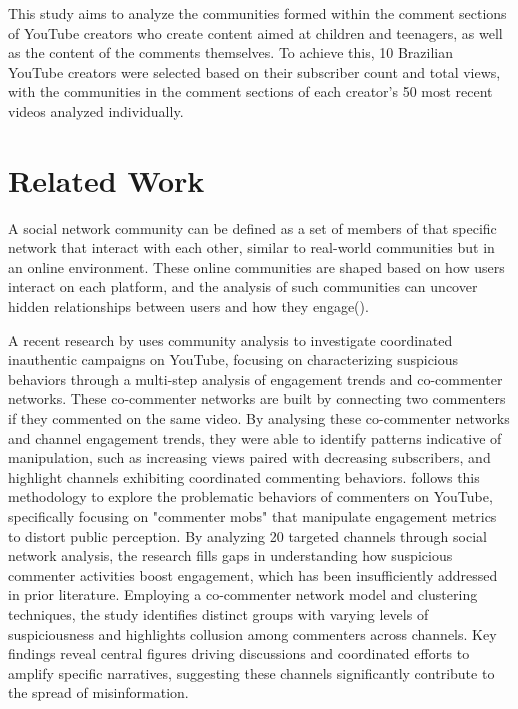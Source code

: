 \documentclass[12pt]{article}
\begin{document}
This study aims to analyze the communities formed within the comment sections of 
YouTube creators who create content aimed at children and teenagers, as well as the content of the 
comments themselves. 
To achieve this, 10 Brazilian YouTube creators were selected based on their 
subscriber count and total views, with the communities in the comment sections of each creator's 50
most recent videos analyzed individually.

\section{Related Work}

A social network community can be defined as a set of members of that specific network that interact
with each other, similar to real-world communities but in an online environment.
These online communities are shaped based on how users interact on each platform, and the analysis
of such communities can uncover hidden relationships between users and how they engage(\cite{nooribakhsh2024community}).

A recent research by \cite{kirdemir2023} uses community analysis to investigate coordinated 
inauthentic campaigns on YouTube, focusing on characterizing suspicious behaviors through a 
multi-step analysis of engagement trends and co-commenter networks. These co-commenter networks are
built by connecting two commenters if they commented on the same video.
By analysing these co-commenter networks and channel engagement trends, they were able to identify
patterns indicative of manipulation, such as increasing views paired with decreasing subscribers, 
and highlight channels exhibiting coordinated 
commenting behaviors. \cite{shajari2023} follows this methodology to
explore the problematic behaviors of commenters on YouTube, specifically focusing on "commenter mobs" 
that manipulate engagement metrics to distort public perception. 
By analyzing 20 targeted channels through social network analysis, the research fills gaps in 
understanding how suspicious commenter activities boost engagement, which has been insufficiently 
addressed in prior literature. Employing a co-commenter network model and clustering techniques, 
the study identifies distinct groups with varying levels of suspiciousness and highlights collusion 
among commenters across channels. Key findings reveal central figures driving discussions and 
coordinated efforts to amplify specific narratives, suggesting these channels significantly contribute 
to the spread of misinformation. 
\end{document}
